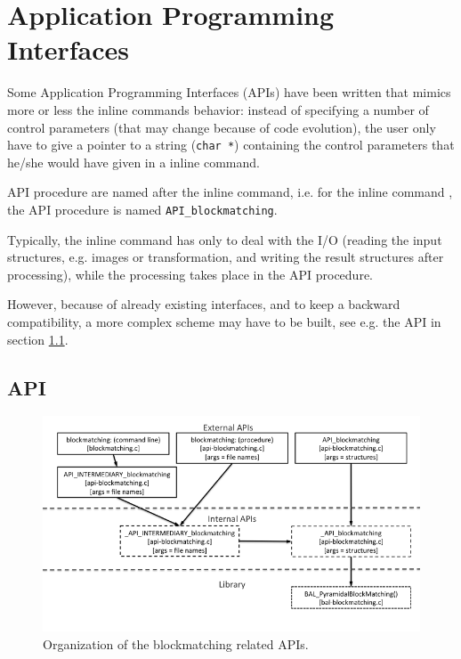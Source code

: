 \chapter{Application Programming Interfaces}


Some Application Programming Interfaces (APIs) have been written that mimics more or less the inline commands behavior: instead of specifying a number of control parameters (that may change because of code evolution), the user only have to give a pointer to a string (\texttt{char *}) containing the control parameters that he/she would have given in a inline command. 

API procedure are named after the inline command, i.e. for the inline command \blockmatching, the API procedure is named \texttt{API\_blockmatching}.

\begin{attention}
Typically, the inline command has only to deal with the I/O (reading the input structures, e.g. images or transformation, and writing the result structures after processing), while the processing takes place in the API procedure.

However, because of already existing interfaces, and to keep a backward compatibility, a more complex scheme may have to be built, see e.g. the \blockmatching API in section \ref{sec:api:blockmatching}.
\end{attention}


\section{\blockmatching API}
\label{sec:api:blockmatching}

\begin{figure}[ht]
\begin{center}
 \includegraphics[width=0.8\linewidth]{figures/api-blockmatching.png}
\end{center}
\caption{\label{fig:api:blockmatching} Organization of the blockmatching related APIs.}
\end{figure}
